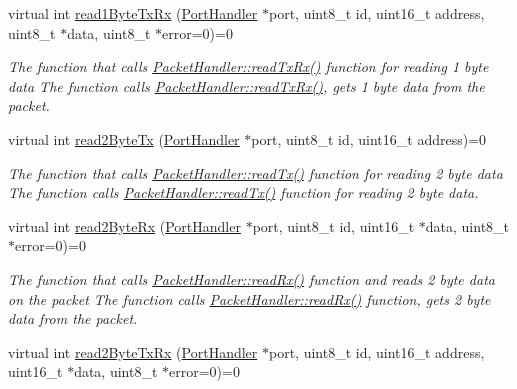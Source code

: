 \begin{DoxyCompactItemize}
virtual int \hyperlink{classmercury_1_1_packet_handler_a69f3253e59e7b285747db9dcd4c02723}{read1\+Byte\+Tx\+Rx} (\hyperlink{classmercury_1_1_port_handler}{Port\+Handler} $\ast$port, uint8\+\_\+t id, uint16\+\_\+t address, uint8\+\_\+t $\ast$data, uint8\+\_\+t $\ast$error=0)=0
\begin{DoxyCompactList}\small\item\em The function that calls \hyperlink{classmercury_1_1_packet_handler_ac743a57bba9e71aadb1578f0e704f166}{Packet\+Handler\+::read\+Tx\+Rx()} function for reading 1 byte data  The function calls \hyperlink{classmercury_1_1_packet_handler_ac743a57bba9e71aadb1578f0e704f166}{Packet\+Handler\+::read\+Tx\+Rx()},  gets 1 byte data from the packet. \end{DoxyCompactList}\item 
virtual int \hyperlink{classmercury_1_1_packet_handler_aecb0bdf7b52d85e417b2bd2d5c539266}{read2\+Byte\+Tx} (\hyperlink{classmercury_1_1_port_handler}{Port\+Handler} $\ast$port, uint8\+\_\+t id, uint16\+\_\+t address)=0
\begin{DoxyCompactList}\small\item\em The function that calls \hyperlink{classmercury_1_1_packet_handler_a58220a79dcdff959241bd5688e6dbb1a}{Packet\+Handler\+::read\+Tx()} function for reading 2 byte data  The function calls \hyperlink{classmercury_1_1_packet_handler_a58220a79dcdff959241bd5688e6dbb1a}{Packet\+Handler\+::read\+Tx()} function for reading 2 byte data. \end{DoxyCompactList}\item 
virtual int \hyperlink{classmercury_1_1_packet_handler_a31cd98b259f0732baf1791014f2eed85}{read2\+Byte\+Rx} (\hyperlink{classmercury_1_1_port_handler}{Port\+Handler} $\ast$port, uint8\+\_\+t id, uint16\+\_\+t $\ast$data, uint8\+\_\+t $\ast$error=0)=0
\begin{DoxyCompactList}\small\item\em The function that calls \hyperlink{classmercury_1_1_packet_handler_a0857bd487c48ea83fc2b93e1e3e80200}{Packet\+Handler\+::read\+Rx()} function and reads 2 byte data on the packet  The function calls \hyperlink{classmercury_1_1_packet_handler_a0857bd487c48ea83fc2b93e1e3e80200}{Packet\+Handler\+::read\+Rx()} function,  gets 2 byte data from the packet. \end{DoxyCompactList}\item 
virtual int \hyperlink{classmercury_1_1_packet_handler_aed1867891e008664d21eaa1280551323}{read2\+Byte\+Tx\+Rx} (\hyperlink{classmercury_1_1_port_handler}{Port\+Handler} $\ast$port, uint8\+\_\+t id, uint16\+\_\+t address, uint16\+\_\+t $\ast$data, uint8\+\_\+t $\ast$error=0)=0

\end{DoxyCompactItemize}
